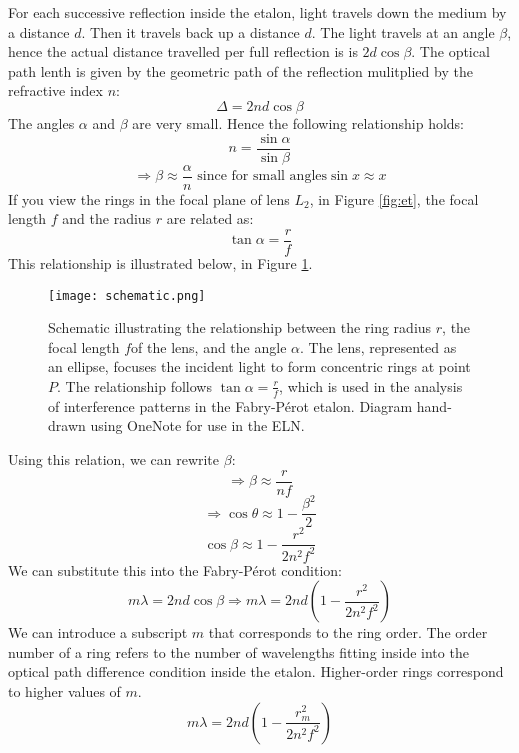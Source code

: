 \documentclass[11pt,twocolumn, a4paper]{article}
\numberwithin{equation}{section} %
\numberwithin{figure}{section} %
\numberwithin{table}{section} %
\begin{document}
For each successive reflection inside the etalon, light travels down the medium by a distance \(d\). Then it travels back up a distance \(d\).  The light travels at an angle \(\beta\), hence the actual distance travelled per full reflection is  is \(2d\cos\beta\).  The optical path lenth is given by the geometric path of the reflection mulitplied by the refractive index \(n\):
\begin{equation}
    \Delta = 2nd\cos\beta
\end{equation}
The angles \(\alpha\) and \(\beta \) are very small. Hence the following relationship holds:
\[
n = \frac{\sin \alpha}{\sin \beta}
\]
\[
\Rightarrow \beta \approx \frac{\alpha}{n} \text{ since for small angles} \sin x \approx x 
\]
If you view the rings in the focal plane of lens \(L_2\), in Figure \ref{fig:et}, the focal length \(f\) and the radius \(r\) are related as:
\begin{equation}
    \tan \alpha = \frac{r}{f}
\end{equation}
This relationship is illustrated below, in Figure \ref{fig:lens}.
\begin{figure}[H]
    \centering
    \texttt{[image: schematic.png]}
    \caption{Schematic illustrating the relationship between the ring radius \(r\), the focal length \(f\)of the lens, and the angle \(\alpha\). The lens, represented as an ellipse, focuses the incident light to form concentric rings at point \(P\). The relationship follows \(\tan \alpha = \frac{r}{f}\), which is used in the analysis of interference patterns in the Fabry-Pérot etalon. Diagram hand-drawn using OneNote for use in the ELN.}
    \label{fig:lens}
\end{figure}
Using this relation, we can rewrite \(\beta\):
\[
\Rightarrow \beta \approx \frac{r}{nf}
\]
\[
\Rightarrow \cos \theta \approx 1 - \frac{\beta^2}{2}
\]
\[\cos\beta \approx 1 - \frac{r^2}{2n^2f^2}\]
We can substitute this into the Fabry-Pérot condition:
\[    m \lambda = 2nd \cos \beta \Rightarrow   m \lambda = 2 n d \left(1 - \frac{r^2}{2 n^2 f^2}\right)\]
We can introduce a subscript \(m\) that corresponds to the ring order. The order number of a ring refers to the number of wavelengths fitting inside into the optical path difference condition inside the etalon. Higher-order rings correspond to higher values of \(m\). 
\begin{equation}\label{eq:exp1}
m \lambda = 2 n d \left(1 - \frac{r_m^2}{2 n^2 f^2}\right)
\end{equation}
\end{document}
